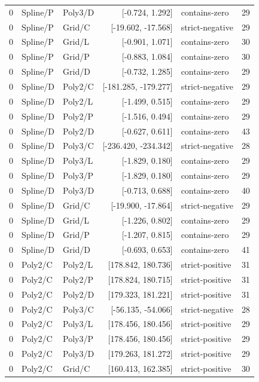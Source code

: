 \begin{longtable}{lllrlr}
0 & Spline/P & Poly3/D & [-0.724, 1.292] & contains-zero & 29 \\
0 & Spline/P & Grid/C & [-19.602, -17.568] & strict-negative & 29 \\
0 & Spline/P & Grid/L & [-0.901, 1.071] & contains-zero & 30 \\
0 & Spline/P & Grid/P & [-0.883, 1.084] & contains-zero & 30 \\
0 & Spline/P & Grid/D & [-0.732, 1.285] & contains-zero & 29 \\
0 & Spline/D & Poly2/C & [-181.285, -179.277] & strict-negative & 29 \\
0 & Spline/D & Poly2/L & [-1.499, 0.515] & contains-zero & 29 \\
0 & Spline/D & Poly2/P & [-1.516, 0.494] & contains-zero & 29 \\
0 & Spline/D & Poly2/D & [-0.627, 0.611] & contains-zero & 43 \\
0 & Spline/D & Poly3/C & [-236.420, -234.342] & strict-negative & 28 \\
0 & Spline/D & Poly3/L & [-1.829, 0.180] & contains-zero & 29 \\
0 & Spline/D & Poly3/P & [-1.829, 0.180] & contains-zero & 29 \\
0 & Spline/D & Poly3/D & [-0.713, 0.688] & contains-zero & 40 \\
0 & Spline/D & Grid/C & [-19.900, -17.864] & strict-negative & 29 \\
0 & Spline/D & Grid/L & [-1.226, 0.802] & contains-zero & 29 \\
0 & Spline/D & Grid/P & [-1.207, 0.815] & contains-zero & 29 \\
0 & Spline/D & Grid/D & [-0.693, 0.653] & contains-zero & 41 \\
0 & Poly2/C & Poly2/L & [178.842, 180.736] & strict-positive & 31 \\
0 & Poly2/C & Poly2/P & [178.824, 180.715] & strict-positive & 31 \\
0 & Poly2/C & Poly2/D & [179.323, 181.221] & strict-positive & 31 \\
0 & Poly2/C & Poly3/C & [-56.135, -54.066] & strict-negative & 28 \\
0 & Poly2/C & Poly3/L & [178.456, 180.456] & strict-positive & 29 \\
0 & Poly2/C & Poly3/P & [178.456, 180.456] & strict-positive & 29 \\
0 & Poly2/C & Poly3/D & [179.263, 181.272] & strict-positive & 29 \\
0 & Poly2/C & Grid/C & [160.413, 162.385] & strict-positive & 30 \\

\end{longtable}
